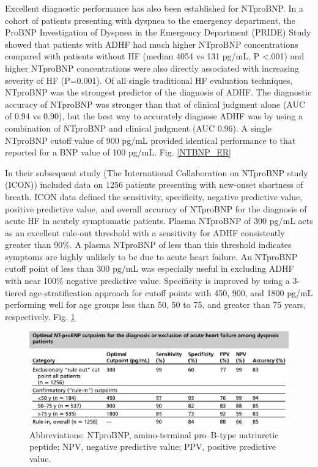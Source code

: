 \documentclass[14pt,a4paper,onecolumn]{extarticle}
\begin{document}
Excellent diagnostic performance has also been established for NTproBNP. In a cohort of patients presenting with dyspnea to the emergency department, the ProBNP Investigation of Dyspnea in the Emergency Department (PRIDE) Study showed that patients with ADHF had much higher NTproBNP concentrations compared with patients without HF (median 4054 vs 131 pg/mL, P <.001) and higher NTproBNP concentrations were also directly associated with increasing severity of HF (P=0.001). Of all single traditional HF evaluation techniques, NTproBNP was the strongest predictor of the diagnosis of ADHF. The diagnostic accuracy of NTproBNP was stronger than that of clinical judgment alone (AUC of 0.94 vs 0.90), but the best way to accurately diagnose ADHF was by using a combination of NTproBNP and clinical judgment (AUC 0.96). A single NTproBNP cutoff value of 900 pg/mL provided identical performance to that reported for a BNP value of 100 pg/mL. Fig. \ref{NTBNP_ER} \citep{Januzzi2005}

In their subsequent study (The International Collaboration on NTproBNP study (ICON)) \citep{Januzzi2006a} included data on 1256 patients presenting with new-onset shortness of breath. ICON data defined the sensitivity, specificity, negative predictive value, positive predictive value, and overall accuracy of NTproBNP for the diagnosis of acute HF in acutely symptomatic patients.  Plasma NTproBNP of 300 pg/mL acts as an excellent rule-out threshold with a sensitivity for ADHF consistently greater than 90\%. A plasma NTproBNP of less than this threshold indicates symptoms are highly unlikely to be due to acute heart failure. An NTproBNP cutoff point of less than 300 pg/mL was especially useful in excluding ADHF with near 100\% negative predictive value. Specificity is improved by using a 3-tiered age-stratification approach for cutoff points with 450, 900, and 1800 pg/mL performing well for age groups less than 50, 50 to 75, and greater than 75 years, respectively. Fig. \ref{NTBNP_cutpoints}

\begin{figure}   \includegraphics{../../images/NTBNP_cutpoints.png}   \caption{Abbreviations: NTproBNP, amino-terminal pro–B-type natriuretic peptide; NPV, negative predictive value; PPV, positive predictive value.\citep{Januzzi2006a}}   \label{NTBNP_cutpoints} \end{figure}
\end{document}
